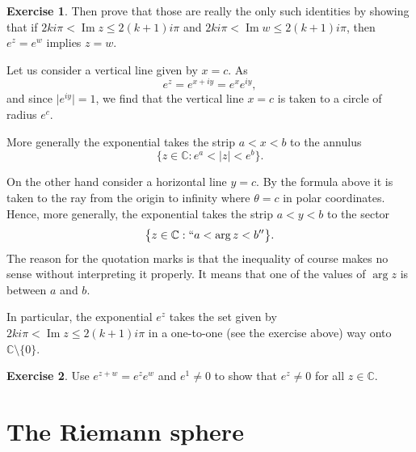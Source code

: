 \documentclass[12pt,openany]{book}
\renewcommand{\Im}{\operatorname{Im}}
\newcommand{\sabs}[1]{\lvert {#1} \rvert}
\newcommand{\C}{{\mathbb{C}}}
\theoremstyle{plain}
\theoremstyle{remark}
\theoremstyle{definition}
\newenvironment{exbox}{%
    \def\FrameCommand{\vrule width 1pt \relax\hspace {10pt}}%
    \MakeFramed {\advance \hsize -\width \FrameRestore }%
}{%
    \endMakeFramed
}
\theoremstyle{exercise}
\newtheorem{exercise}{Exercise}[section]
\theoremstyle{example}
\begin{document}
\begin{exbox}
\begin{exercise}
Then prove that those are really the only such identities by
showing that if $2ki\pi < \Im z \leq 2(k+1)i\pi$ and
$2ki\pi < \Im w \leq 2(k+1)i\pi$, then $e^z=e^w$ implies $z=w$.
\end{exercise}
\end{exbox}

Let us consider a vertical line given by $x=c$.  As
\begin{equation*}
e^{z} = 
e^{x+iy} =
e^x e^{iy} ,
\end{equation*}
and since $\sabs{e^{iy}} =1$, we find that the vertical line $x=c$ is taken to a
circle of radius $e^c$.

More generally the exponential takes the strip $a < x < b$ to the
annulus
\begin{equation*}
\bigl\{ z \in \C : e^a < \sabs{z} < e^b \bigr\} .
\end{equation*}

On the other hand consider a horizontal line $y=c$.  By the formula above it
is taken to the ray from the origin to infinity where $\theta = c$ in polar
coordinates.  Hence, more generally,
the exponential takes the strip $a < y < b$ to the
sector
\begin{equation*}
\bigl\{ z \in \C : ``a < \arg z < b'' \bigr\} .
\end{equation*}
The reason for the quotation marks is that the inequality of course makes no
sense without interpreting it properly.  It means that one of the values
of $\arg z$ is between $a$ and $b$.

In particular, the exponential $e^z$ takes the set given by
$2ki\pi < \Im z \leq 2(k+1)i\pi$ in a one-to-one (see the exercise above)
way onto $\C \setminus \{ 0 \}$.

\begin{exbox}
\begin{exercise}
Use $e^{z+w} = e^z e^w$ and $e^1 \not= 0$ to show that $e^z \not=0$ for all
$z \in \C$.
\end{exercise}
\end{exbox}

\section{The Riemann sphere}
\end{document}
